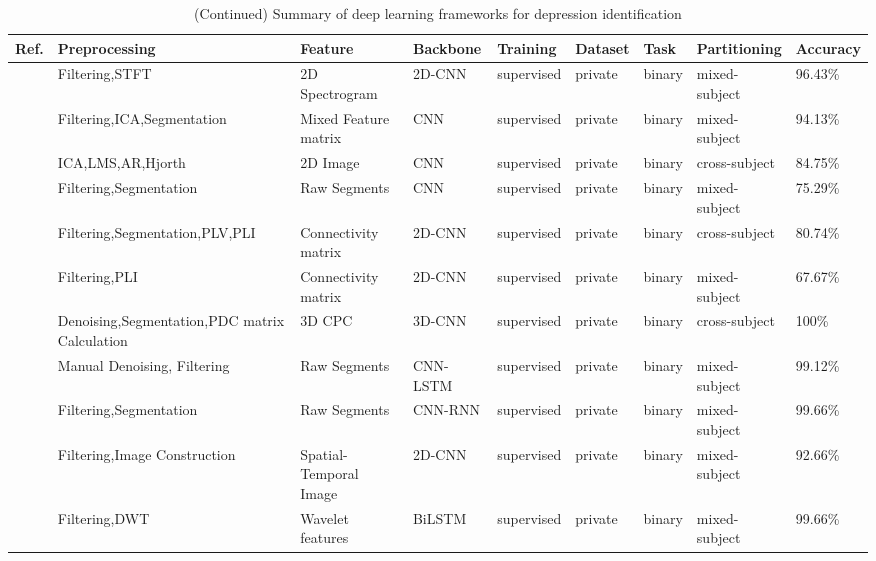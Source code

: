\begin{table*}[ht]
\renewcommand{\arraystretch}{1.2}
\caption*{(Continued) Summary of deep learning frameworks for depression identification}
\footnotesize
\begin{tabular}{p{0.4cm}p{2.8cm}p{2cm}p{1.5cm}p{1.9cm}p{1.9cm}p{0.8cm}p{1.8cm}p{1.5cm}}
\hline
\textbf{Ref.} & \textbf{Preprocessing} & \textbf{Feature} & \textbf{Backbone} & \textbf{Training} & \textbf{Dataset} & \textbf{Task} & \textbf{Partitioning} & \textbf{Accuracy} \\
\hline
~\cite{MDD34} & Filtering,STFT & 2D Spectrogram & 2D-CNN & supervised & private & binary & mixed-subject & 96.43\% \\
~\cite{MDD35} & Filtering,ICA,Segmentation & Mixed Feature matrix & CNN & supervised & private & binary & mixed-subject & 94.13\% \\
~\cite{li2019depression} & ICA,LMS,AR,Hjorth & 2D Image & CNN & supervised & private & binary & cross-subject & 84.75\% \\
~\cite{MDD37} & Filtering,Segmentation & Raw Segments & CNN & supervised & private & binary & mixed-subject & 75.29\% \\
~\cite{MDD38} & Filtering,Segmentation,\newline PLV,PLI & Connectivity \newline matrix & 2D-CNN & supervised & private & binary & cross-subject & 80.74\% \\
~\cite{MDD39} & Filtering,PLI & Connectivity \newline matrix & 2D-CNN & supervised & private & binary & mixed-subject & 67.67\% \\
~\cite{khan2021automated} & Denoising,Segmentation,\newline PDC matrix Calculation & 3D CPC & 3D-CNN & supervised & private & binary & cross-subject & 100\% \\
~\cite{ay2019automated} & Manual Denoising, \newline Filtering& Raw Segments & CNN-LSTM & supervised & private & binary & mixed-subject & 99.12\% \\
~\cite{MDD42} & Filtering,Segmentation & Raw Segments & CNN-RNN & supervised & private & binary & mixed-subject & 99.66\% \\
~\cite{MDD43} & Filtering,Image Construction & Spatial-Temporal Image & 2D-CNN & supervised & private & binary & mixed-subject & 92.66\% \\
~\cite{MDD44} & Filtering,DWT & Wavelet features & BiLSTM & supervised & private & binary & mixed-subject & 99.66\% \\

\end{tabular}
\end{table*}
